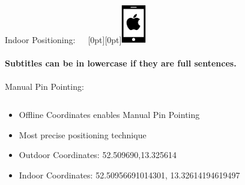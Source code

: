 \documentclass[11pt]{beamer}
\begin{document}
\begin{frame}{Indoor Positioning:~~~\raisebox{-10pt}[0pt][0pt]{\includegraphics[width=0.08\textwidth]{tech-stack-apple}}}

\framesubtitle{Subtitles can be in lowercase if they are full sentences.}
Manual Pin Pointing:

  \begin{columns}[T]
  \begin{column}{.6\textwidth}
  \begin{itemize}
 \item Offline Coordinates enables Manual Pin Pointing
 \item Most precise positioning technique
 \item Outdoor Coordinates: 52.509690,13.325614
 \item Indoor Coordinates: 52.50956691014301, 13.32614194619497


\end{itemize}
\end{column}
\end{columns}
\end{frame}
\end{document}

